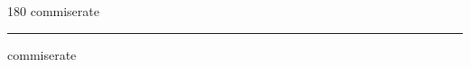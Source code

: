 
\begin{frame}
\begin{center}
\begin{turn}{180}
{\fontsize{2.5cm}{1em}\selectfont commiserate}
\end{turn}
\vspace{1em}\par  
\hrule
\vspace{1em}\par  
{\fontsize{2.5cm}{1em}\selectfont commiserate}
\end{center}
\end{frame}
